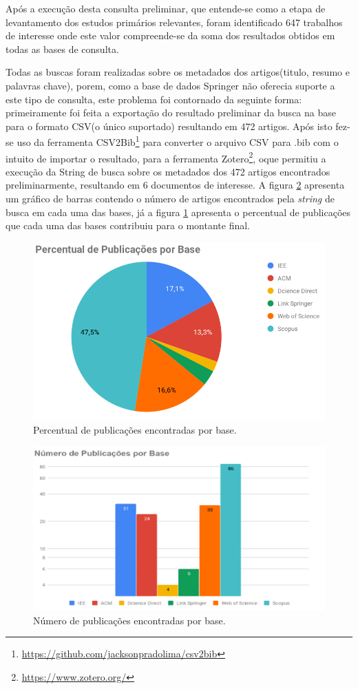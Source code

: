 \documentclass[tid,table]{texufpel} %
\begin{document}
Após a execução desta consulta preliminar, que entende-se como a etapa de levantamento dos estudos primários relevantes, foram identificado 647 trabalhos de interesse onde este valor  compreende-se da soma dos resultados obtidos em todas as bases de consulta.

Todas as buscas foram realizadas sobre os metadados dos artigos(titulo, resumo e palavras chave), porem, como a base de dados Springer não oferecia suporte a este tipo de consulta, este problema foi contornado da seguinte forma: primeiramente foi feita a exportação do resultado preliminar da busca na base para o formato CSV(o único suportado) resultando em 472 artigos. Após isto fez-se uso da ferramenta CSV2Bib\footnote{\url{https://github.com/jacksonpradolima/csv2bib}} para converter o arquivo CSV para .bib com o intuito de importar o resultado, para a ferramenta Zotero\footnote{\url{https://www.zotero.org/}}, oque permitiu a execução da String de busca sobre os metadados dos 472 artigos encontrados preliminarmente, resultando em 6 documentos de interesse. A figura  \ref{fig:GrafBarraPubAno} apresenta um gráfico de barras contendo o número de artigos encontrados pela \textit{string} de busca em cada uma das bases, já a figura \ref{fig:GrafPizPubAno} apresenta o percentual de publicações que cada uma das bases contribuiu para o montante final.

\begin{figure}[ht]
	\centering
	\includegraphics[width=.9\textwidth]{imagens/GrafPizPubAno.png}
	\caption{Percentual de publicações encontradas por base.}
	\label{fig:GrafPizPubAno}
\end{figure}

\begin{figure}[ht]
	\centering
	\includegraphics[width=.9\textwidth]{imagens/GrafBarraPubAno.png}
	\caption{Número de publicações encontradas por base.}
	\label{fig:GrafBarraPubAno}
\end{figure}
\end{document}
